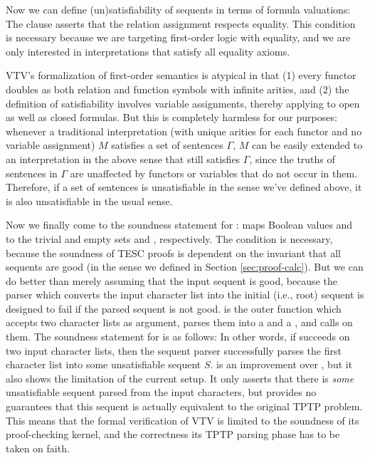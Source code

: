 \documentclass[12pt]{article}
\begin{document}
Now we can define (un)satisfiability of sequents in terms of formula valuations: 
The \AgdaSpace{} clause asserts that the
relation assignment  respects equality. This condition is necessary
because we are targeting first-order logic with equality, and we are only 
interested in interpretations that satisfy all equality axioms.

VTV's formalization of first-order semantics is atypical in that (1) every functor
doubles as both relation and function symbols with infinite arities, and 
(2) the definition of satisfiability involves variable assignments, thereby applying to
open as well as closed formulas. But this is completely harmless for our purposes:
whenever a traditional interpretation (with unique arities for each functor and no 
variable assignment) $M$ satisfies a set of sentences $\Gamma$, $M$ can be easily extended 
to an interpretation in the above sense that still satisfies $\Gamma$, since the 
truths of sentences in $\Gamma$ are unaffected by functors or variables that do not 
occur in them. Therefore, if a set of sentences is unsatisfiable in the sense we've
defined above, it is also unsatisfiable in the usual sense. 

Now we finally come to the soundness statement for :
 \AgdaSymbol{:}    
maps Boolean values  and  to
the trivial and empty sets  and , respectively.
The condition \AgdaSpace{} is necessary, because 
the soundness of TESC proofs is dependent on the invariant that all sequents are good
(in the sense we defined in Section \ref{sec:proof-calc}).
But we can do better than merely assuming that the input sequent is good,
because the parser which converts the input character list into the initial (i.e., root) 
sequent is designed to fail if the parsed sequent is not good. 
is the outer function which accepts two character lists as argument, parses them 
into a  and a , and calls 
on them. The soundness statement for  is as follows:
In other words, if  succeeds on two input character lists, 
then the sequent parser successfully parses the first character list into some unsatisfiable 
sequent $S$.  is an improvement over ,
but it also shows the limitation of the current setup. It only asserts that there is 
\textit{some} unsatisfiable sequent parsed from the input characters, 
but provides no guarantees that this sequent is actually equivalent to the original
TPTP problem. This means that the formal verification of VTV is limited to the soundness 
of its proof-checking kernel, and the correctness its TPTP parsing phase has to be 
taken on faith.
\end{document}
